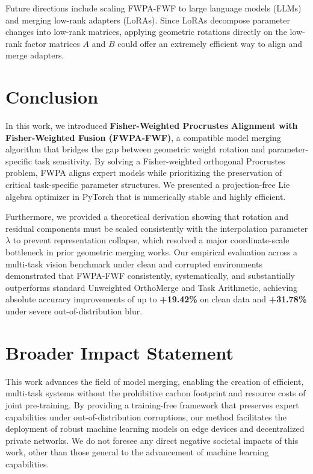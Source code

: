 \documentclass{article}
\theoremstyle{plain}
\theoremstyle{definition}
\theoremstyle{remark}
\begin{document}
Future directions include scaling FWPA-FWF to large language models (LLMs) and merging low-rank adapters (LoRAs). Since LoRAs decompose parameter changes into low-rank matrices, applying geometric rotations directly on the low-rank factor matrices $A$ and $B$ could offer an extremely efficient way to align and merge adapters.

\section{Conclusion}
\label{sec:conclusion}
In this work, we introduced \textbf{Fisher-Weighted Procrustes Alignment with Fisher-Weighted Fusion (FWPA-FWF)}, a compatible model merging algorithm that bridges the gap between geometric weight rotation and parameter-specific task sensitivity. By solving a Fisher-weighted orthogonal Procrustes problem, FWPA aligns expert models while prioritizing the preservation of critical task-specific parameter structures. We presented a projection-free Lie algebra optimizer in PyTorch that is numerically stable and highly efficient. 

Furthermore, we provided a theoretical derivation showing that rotation and residual components must be scaled consistently with the interpolation parameter $\lambda$ to prevent representation collapse, which resolved a major coordinate-scale bottleneck in prior geometric merging works. Our empirical evaluation across a multi-task vision benchmark under clean and corrupted environments demonstrated that FWPA-FWF consistently, systematically, and substantially outperforms standard Unweighted OrthoMerge and Task Arithmetic, achieving absolute accuracy improvements of up to \textbf{+19.42\%} on clean data and \textbf{+31.78\%} under severe out-of-distribution blur.

\section*{Broader Impact Statement}
This work advances the field of model merging, enabling the creation of efficient, multi-task systems without the prohibitive carbon footprint and resource costs of joint pre-training. By providing a training-free framework that preserves expert capabilities under out-of-distribution corruptions, our method facilitates the deployment of robust machine learning models on edge devices and decentralized private networks. We do not foresee any direct negative societal impacts of this work, other than those general to the advancement of machine learning capabilities.
\end{document}
